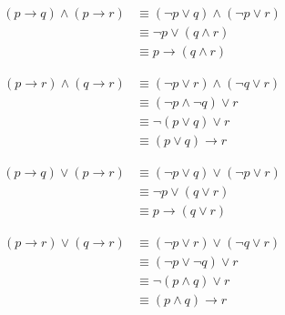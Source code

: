 {{        %
        \begin{practices}
            \begin{align*}
                (p \rightarrow q) \wedge (p \rightarrow r)
                &\equiv (\neg p \vee q) \wedge (\neg p \vee r) \\
                &\equiv \neg p \vee (q \wedge r) \\
                &\equiv p \rightarrow (q \wedge r)
            \end{align*}
        \end{practices}

        \begin{practices}
            \begin{align*}
                (p \rightarrow r) \wedge (q \rightarrow r)
                &\equiv (\neg p \vee r) \wedge (\neg q \vee r) \\
                &\equiv (\neg p \wedge \neg q) \vee r \\
                &\equiv \neg (p \vee q) \vee r \\
                &\equiv (p \vee q) \rightarrow r
            \end{align*}
        \end{practices}

        \begin{practices}
            \begin{align*}
                (p \rightarrow q) \vee (p \rightarrow r)
                &\equiv (\neg p \vee q) \vee (\neg p \vee r) \\
                &\equiv \neg p \vee (q \vee r) \\
                &\equiv p \rightarrow (q \vee r)
            \end{align*}
        \end{practices}

        \begin{practices}
            \begin{align*}
                (p \rightarrow r) \vee (q \rightarrow r)
                &\equiv (\neg p \vee r) \vee (\neg q \vee r) \\
                &\equiv (\neg p \vee \neg q) \vee r \\
                &\equiv \neg (p \wedge q) \vee r \\
                &\equiv (p \wedge q) \rightarrow r
            \end{align*}
        \end{practices}

}}
